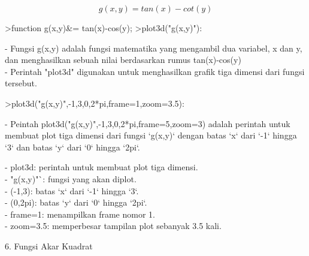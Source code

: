 \documentclass{article}
\begin{document}
\begin{eulernotebook}
\begin{eulercomment}
\begin{eulercomment}
\begin{eulercomment}
\begin{eulercomment}
\begin{eulercomment}
\end{eulercomment}
\begin{eulerformula}
\[
g(x,y)=tan(x) - cot(y)
\]
\end{eulerformula}
\begin{eulerprompt}
>function g(x,y)&= tan(x)-cos(y);
>plot3d("g(x,y)"):
\end{eulerprompt}
\begin{eulercomment}
- Fungsi g(x,y) adalah fungsi matematika yang mengambil dua variabel,
x dan y, dan menghasilkan sebuah nilai berdasarkan rumus tan(x)-cos(y)\\
- Perintah "plot3d" digunakan untuk menghasilkan grafik tiga dimensi
dari fungsi tersebut.
\end{eulercomment}
\begin{eulerprompt}
>plot3d("g(x,y)",-1,3,0,2*pi,frame=1,zoom=3.5):
\end{eulerprompt}
\begin{eulercomment}
- Peintah plot3d("g(x,y)",-1,3,0,2*pi,frame=5,zoom=3) adalah perintah
untuk membuat plot tiga dimensi dari fungsi `g(x,y)` dengan batas `x`
dari `-1` hingga `3` dan batas `y` dari `0` hingga `2pi`.

- plot3d: perintah untuk membuat plot tiga dimensi.\\
- "g(x,y)"`: fungsi yang akan diplot.\\
- (-1,3): batas `x` dari `-1` hingga `3`.\\
- (0,2pi): batas `y` dari `0` hingga `2pi`.\\
- frame=1: menampilkan frame nomor 1.\\
- zoom=3.5: memperbesar tampilan plot sebanyak 3.5 kali.

\end{eulercomment}
\eulersubheading{}
\begin{eulercomment}
6. Fungsi Akar Kuadrat


\end{eulercomment}
\end{eulercomment}
\end{eulercomment}
\end{eulercomment}
\end{eulercomment}
\end{eulernotebook}
\end{document}
